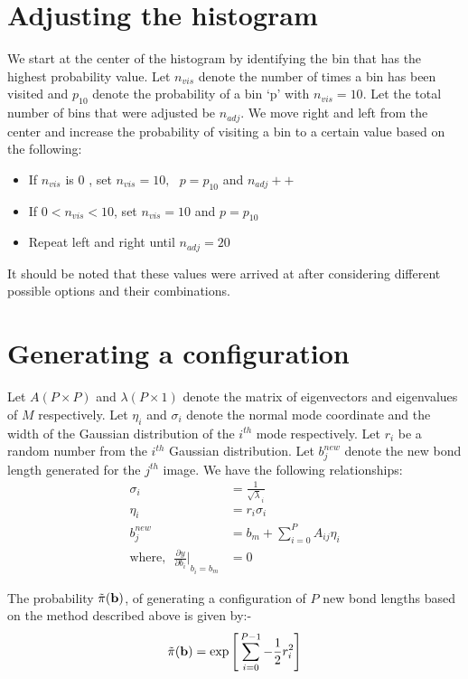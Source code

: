     \section{Adjusting the histogram}
        We start at the center of the histogram by identifying the bin that has the highest probability value. Let $n_{vis}$ denote the number of times a bin has been visited and $p_{10}$ denote the probability of a bin `p' with $n_{vis} = 10$. Let the total number of bins that were adjusted be $n_{adj}$. We move right and left from the center and increase the probability of visiting a bin to a certain value based on the following:
        \begin{itemize}
            \item If $n_{vis}$ is $0$ , set $n_{vis} = 10, \: \: \: p = p_{10}$ and $n_{adj}++$
            \item If $0 < n_{vis} < 10$, set $n_{vis} = 10$ and $p = p_{10}$
            \item Repeat left and right until $n_{adj} = 20$
        \end{itemize}

        It should be noted that these values were arrived at after considering different possible options and their combinations.

    \section{Generating a configuration}
        Let $A (P \times P)$ and $\lambda (P \times 1)$ denote the matrix of eigenvectors  and eigenvalues of $M$ respectively. Let $\eta_i$ and $\sigma_i$ denote the normal mode coordinate and the width of the Gaussian distribution of the $i^{th}$ mode respectively. Let $r_i$ be a random number from the $i^{th}$ Gaussian distribution. Let $b^{new}_j$ denote the new bond length generated for the $j^{th}$ image. We have the following relationships:
        \begin{equation}
            \begin{aligned}
                \sigma_i &= \frac{1}{\sqrt \lambda_i}\\
                \eta_i &= r_i  \sigma_i\\
                b_j^{new} &= b_m + \displaystyle\sum\limits_{i=0}^P A_{ij}  \eta_i\\
                \text{where,} \: \: \: {\frac{\partial y}{\partial b_i} \Bigg|}_{b_i = b_m} &= 0
            \end{aligned}
        \end{equation}

        The probability $\tilde \pi({\mathbf {b}})$, of generating a configuration of $P$ new bond lengths based on the method described above is given by:-
        \begin{equation}
            \tilde \pi({\mathbf {b}}) = \exp \Bigg[ \displaystyle\sum\limits_{i=0}^{P-1} - \frac{1}{2}  r_i^2 \Bigg]
        \end{equation}
